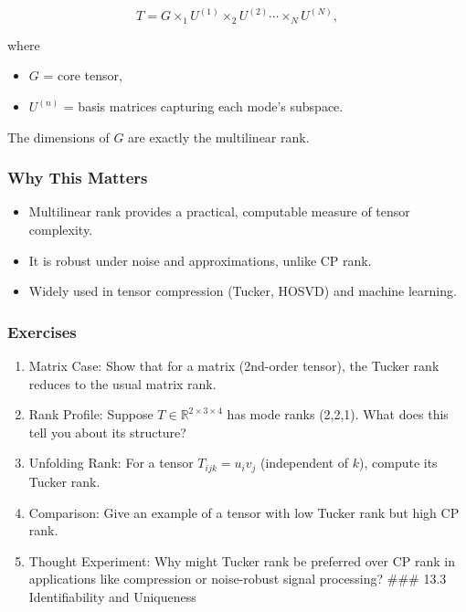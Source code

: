 \documentclass[
  letterpaper,
  DIV=11,
  numbers=noendperiod]{scrreprt}
\providecommand{\tightlist}{%
  \setlength{\itemsep}{0pt}\setlength{\parskip}{0pt}}
\begin{document}
\[
T = G \times_1 U^{(1)} \times_2 U^{(2)} \cdots \times_N U^{(N)},
\]

where

\begin{itemize}
\tightlist
\item
  \(G\) = core tensor,
\item
  \(U^{(n)}\) = basis matrices capturing each mode's subspace.
\end{itemize}

The dimensions of \(G\) are exactly the multilinear rank.

\subsubsection{Why This Matters}\label{why-this-matters-34}

\begin{itemize}
\tightlist
\item
  Multilinear rank provides a practical, computable measure of tensor
  complexity.
\item
  It is robust under noise and approximations, unlike CP rank.
\item
  Widely used in tensor compression (Tucker, HOSVD) and machine
  learning.
\end{itemize}

\subsubsection{Exercises}\label{exercises-47}

\begin{enumerate}
\def\labelenumi{\arabic{enumi}.}
\item
  Matrix Case: Show that for a matrix (2nd-order tensor), the Tucker
  rank reduces to the usual matrix rank.
\item
  Rank Profile: Suppose \(T \in \mathbb{R}^{2 \times 3 \times 4}\) has
  mode ranks (2,2,1). What does this tell you about its structure?
\item
  Unfolding Rank: For a tensor \(T_{ijk} = u_i v_j\) (independent of
  \(k\)), compute its Tucker rank.
\item
  Comparison: Give an example of a tensor with low Tucker rank but high
  CP rank.
\item
  Thought Experiment: Why might Tucker rank be preferred over CP rank in
  applications like compression or noise-robust signal processing?
  \#\#\# 13.3 Identifiability and Uniqueness
\end{enumerate}
\end{document}
